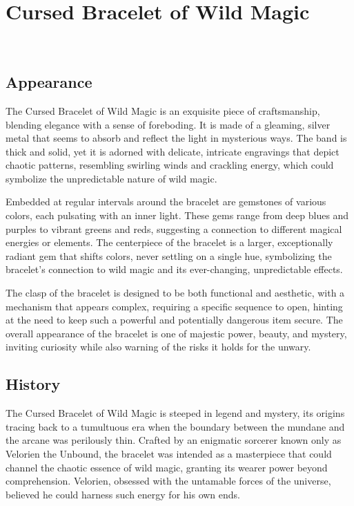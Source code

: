 
\chapter*{Cursed Bracelet of Wild Magic}
\\

\section*{Appearance}
The Cursed Bracelet of Wild Magic is an exquisite piece of craftsmanship, blending elegance with a sense of foreboding. It is made of a gleaming, silver metal that seems to absorb and reflect the light in mysterious ways. The band is thick and solid, yet it is adorned with delicate, intricate engravings that depict chaotic patterns, resembling swirling winds and crackling energy, which could symbolize the unpredictable nature of wild magic.

Embedded at regular intervals around the bracelet are gemstones of various colors, each pulsating with an inner light. These gems range from deep blues and purples to vibrant greens and reds, suggesting a connection to different magical energies or elements. The centerpiece of the bracelet is a larger, exceptionally radiant gem that shifts colors, never settling on a single hue, symbolizing the bracelet's connection to wild magic and its ever-changing, unpredictable effects.

The clasp of the bracelet is designed to be both functional and aesthetic, with a mechanism that appears complex, requiring a specific sequence to open, hinting at the need to keep such a powerful and potentially dangerous item secure. The overall appearance of the bracelet is one of majestic power, beauty, and mystery, inviting curiosity while also warning of the risks it holds for the unwary.

\section*{History}
The Cursed Bracelet of Wild Magic is steeped in legend and mystery, its origins tracing back to a tumultuous era when the boundary between the mundane and the arcane was perilously thin. Crafted by an enigmatic sorcerer known only as Velorien the Unbound, the bracelet was intended as a masterpiece that could channel the chaotic essence of wild magic, granting its wearer power beyond comprehension. Velorien, obsessed with the untamable forces of the universe, believed he could harness such energy for his own ends.

